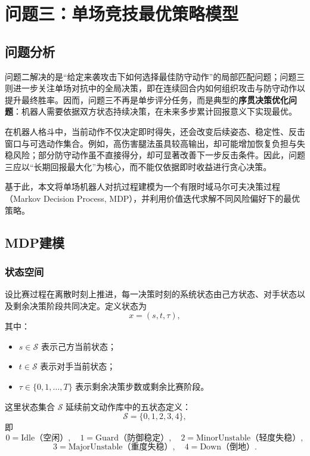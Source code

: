 
\section{问题三：单场竞技最优策略模型}

\subsection{问题分析}

问题二解决的是“给定来袭攻击下如何选择最佳防守动作”的局部匹配问题；问题三则进一步关注单场对抗中的全局决策，即在连续回合内如何组织攻击与防守动作以提升最终胜率。因而，问题三不再是单步评分任务，而是典型的\textbf{序贯决策优化问题}：机器人需要依据双方状态持续决策，在未来多步累计回报意义下实现最优。

在机器人格斗中，当前动作不仅决定即时得失，还会改变后续姿态、稳定性、反击窗口与可选动作集合。例如，高伤害腿法虽具较高输出，却可能增加恢复负担与失稳风险；部分防守动作虽不直接得分，却可显著改善下一步反击条件。因此，问题三应以“长期回报最大化”为核心，而不能仅依据即时收益进行贪心决策。

基于此，本文将单场机器人对抗过程建模为一个有限时域马尔可夫决策过程（Markov Decision Process, MDP），并利用价值迭代求解不同风险偏好下的最优策略。

\subsection{MDP建模}

\subsubsection{状态空间}

设比赛过程在离散时刻上推进，每一决策时刻的系统状态由己方状态、对手状态以及剩余决策阶段共同决定。定义状态为
\[
x=(s,t,\tau),
\]
其中：
\begin{itemize}
    \item \(s\in\mathcal{S}\) 表示己方当前状态；
    \item \(t\in\mathcal{S}\) 表示对手当前状态；
    \item \(\tau\in\{0,1,\dots,T\}\) 表示剩余决策步数或剩余比赛阶段。
\end{itemize}

这里状态集合 \(\mathcal{S}\) 延续前文动作库中的五状态定义：
\[
\mathcal{S}=\{0,1,2,3,4\},
\]
即
\[
0=\text{Idle（空闲）},\quad
1=\text{Guard（防御稳定）},\quad
2=\text{MinorUnstable（轻度失稳）},
\]
\[
3=\text{MajorUnstable（重度失稳）},\quad
4=\text{Down（倒地）}.
\]

